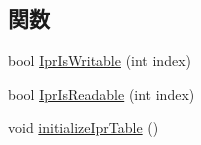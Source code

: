 \subsection*{関数}
\begin{DoxyCompactItemize}
\item 
bool \hyperlink{namespaceAlphaISA_aa3cf21b4a9cdea68799e13e18f44d3d4}{IprIsWritable} (int index)
\item 
bool \hyperlink{namespaceAlphaISA_a7d31db1cc7ca61db4f288b9e525922e1}{IprIsReadable} (int index)
\item 
void \hyperlink{namespaceAlphaISA_abc1bf54037f3c4812019fa985607bbd2}{initializeIprTable} ()
\end{DoxyCompactItemize}
